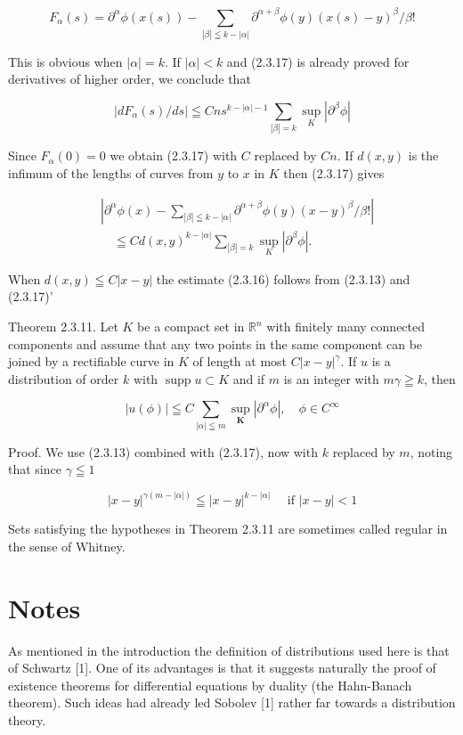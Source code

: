 \[
F_{\alpha}(s)=\partial^{\alpha} \phi(x(s))-\sum_{|\beta| \leqq k-|\alpha|} \partial^{\alpha+\beta} \phi(y)(x(s)-y)^{\beta} / \beta !
\]

This is obvious when $|\alpha|=k$. If $|\alpha|<k$ and (2.3.17) is already proved for derivatives of higher order, we conclude that

\[
\left|d F_{\alpha}(s) / d s\right| \leqq C n s^{k-|\alpha|-1} \sum_{|\beta|=k} \sup _{K}\left|\partial^{\beta} \phi\right|
\]

Since $F_{\alpha}(0)=0$ we obtain (2.3.17) with $C$ replaced by $C n$. If $d(x, y)$ is the infimum of the lengths of curves from $y$ to $x$ in $K$ then (2.3.17) gives


\begin{align*}
& \left|\partial^{\alpha} \phi(x)-\sum_{|\beta| \leqq k-|\alpha|} \partial^{\alpha+\beta} \phi(y)(x-y)^{\beta} / \beta !\right|  \tag{2.3.17}\\
& \quad \leqq C d(x, y)^{k-|\alpha|} \sum_{|\beta|=k} \sup _{K}\left|\partial^{\beta} \phi\right| .
\end{align*}


When $d(x, y) \leqq C|x-y|$ the estimate (2.3.16) follows from (2.3.13) and (2.3.17)'

Theorem 2.3.11. Let $K$ be a compact set in $\mathbb{R}^{n}$ with finitely many connected components and assume that any two points in the same component can be joined by a rectifiable curve in $K$ of length at most $C|x-y|^{\gamma}$. If $u$ is a distribution of order $k$ with $\operatorname{supp} u \subset K$ and if $m$ is an integer with $m \gamma \geqq k$, then


\begin{equation*}
|u(\phi)| \leqq C \sum_{|\alpha| \leqq m} \sup _{\boldsymbol{K}}\left|\partial^{\alpha} \phi\right|, \quad \phi \in C^{\infty} \tag{2.3.18}
\end{equation*}


Proof. We use (2.3.13) combined with (2.3.17), now with $k$ replaced by $m$, noting that since $\gamma \leqq 1$

\[
|x-y|^{\gamma(m-|\alpha|)} \leqq|x-y|^{k-|\alpha|} \quad \text { if }|x-y|<1
\]

Sets satisfying the hypotheses in Theorem 2.3.11 are sometimes called regular in the sense of Whitney.

\section*{Notes}
As mentioned in the introduction the definition of distributions used here is that of Schwartz [1]. One of its advantages is that it suggests naturally the proof of existence theorems for differential equations by duality (the Hahn-Banach theorem). Such ideas had already led Sobolev [1] rather far towards a distribution theory.


